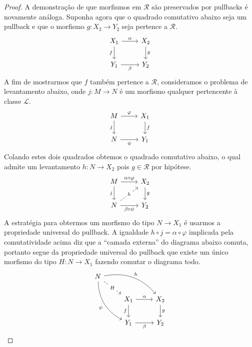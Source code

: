 \begin{proof}
  A demonstração de que morfismos em $\mathcal{R}$ são preservados por pullbacks é novamente análoga.
  Suponha agora que o quadrado comutativo abaixo seja um pullback e que o morfismo $g: X_{2} \to Y_{2}$ seja pertence a $\mathcal{R}$.
  \begin{displaymath}
    \begin{tikzcd}
      X_{1}
      \arrow[r, "\alpha"]
      \arrow[d, "f" swap]
      & X_{2}
      \arrow[d, "g"]
      \\ Y_{1}
      \arrow[r, "\beta" swap]
      & Y_{2}
    \end{tikzcd}
  \end{displaymath}
  A fim de mostrarmos que $f$ também pertence a $\mathcal{R}$, consideramos o problema de levantamento abaixo, onde $j: M \to N$ é um morfismo qualquer pertencente à classe $\mathcal{L}$.
  \begin{displaymath}
    \begin{tikzcd}
      M
      \arrow[r, "\varphi"]
      \arrow[d, "j" swap]
      & X_{1}
      \arrow[d, "f"]
      \\ N
      \arrow[r, "\psi" swap]
      & Y_{1}
    \end{tikzcd}
  \end{displaymath}
  Colando estes dois quadrados obtemos o quadrado comutativo abaixo, o qual admite um levantamento $h: N \to X_{2}$ pois $g \in \mathcal{R}$ por hipótese.
  \begin{displaymath}
    \begin{tikzcd}
      M
      \arrow[r, "\alpha \circ \varphi"]
      \arrow[d, "j" swap]
      & X_{2}
      \arrow[d, "g"]
      \\ N
      \arrow[r, "\beta \circ \psi" swap]
      \arrow[ru, dashed, "h" description]
      & Y_{2}
    \end{tikzcd}
  \end{displaymath}
  A estratégia para obtermos um morfismo do tipo $N \to X_{1}$ é usarmos a propriedade universal do pullback.
  A igualdade $h \circ j = \alpha \circ \varphi$ implicada pela comutatividade acima diz que a ``camada externa'' do diagrama abaixo comuta, portanto segue da propriedade universal do pullback que existe um único morfismo do tipo $H: N \to X_{1}$ fazendo comutar o diagrama todo.
  \begin{displaymath}
    \begin{tikzcd}
      N
      \arrow[rd, dashed, "H" description]
      \arrow[rdd, bend right=30, "\psi" swap]
      \arrow[rrd, bend left=30, "h"]
      \\ & X_{1}
      \arrow[r, "\alpha"]
      \arrow[d, "f" swap]
      & X_{2}
      \arrow[d, "g"]
      \\ & Y_{1}
      \arrow[r, "\beta" swap]
      & Y_{2}
    \end{tikzcd}
  \end{displaymath}


\end{proof}
